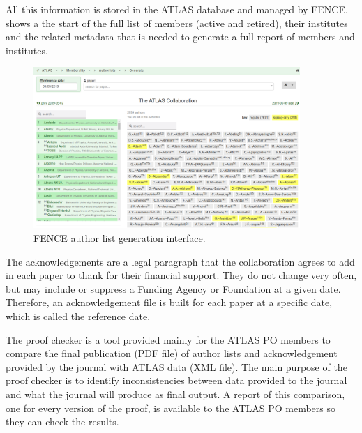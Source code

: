 All this information is stored in the ATLAS database and managed by FENCE\@.
 shows a the start of the full list of members (active and retired), their institutes and the related metadata that is needed to generate a full report of members and institutes.

\begin{figure}[htb]
  \centering
  \includegraphics[width=0.9\textwidth]{figures/authorlist_generation.png}
  \caption{FENCE author list generation interface.
    }%
  \label{fig:authorlist_generation}
\end{figure}

The acknowledgements are a legal paragraph that the collaboration agrees to add in each paper to thank for their financial support.
They do not change very often, but may include or suppress a Funding Agency or Foundation at a given date.
Therefore, an acknowledgement file is built for each paper at a specific date, which is called the reference date.

The proof checker is a tool provided mainly for the ATLAS PO members to compare the final publication (PDF file) of author lists and acknowledgement provided by the journal with ATLAS data (XML file). The main purpose of the proof checker is to identify inconsistencies between data provided to the journal and what the journal will produce as final output. A report of this comparison, one for every version of the proof, is available to the ATLAS PO members so they can check the results.

